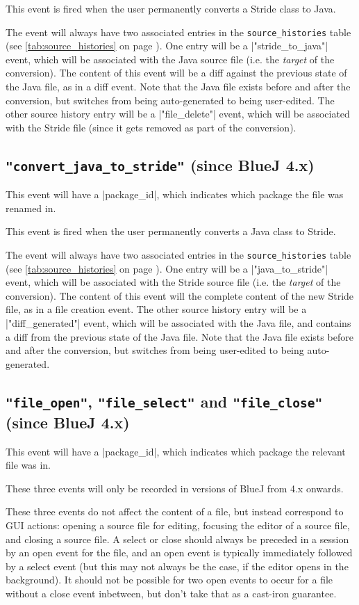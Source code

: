 \documentclass{report}
\newcommand{\myref}[1]{\autoref{#1} on page \pageref*{#1}}
\newcommand{\tabref}[1]{\lstinline|#1| table (see \myref{tab:#1})}
\begin{document}
This event is fired when the user permanently converts a Stride class to Java.

The event will always have two associated entries in the
\tabref{source_histories}.  One entry will be a |"stride_to_java"| event, which will
be associated with the Java source file (i.e. the \textit{target} of the conversion).  The content
  of this event will be a diff against the previous state of the Java file, as in a diff event.  Note that the Java file exists before and after the conversion, but switches from being auto-generated to being user-edited.
The other source history entry will be a |"file_delete"| event, which will be associated with the Stride file (since it gets
removed as part of the conversion).

\subsection{\lstinline!"convert_java_to_stride"! (since BlueJ 4.x)}

This event will have a |package_id|, which indicates which package the file
was renamed in.

This event is fired when the user permanently converts a Java class to Stride.

The event will always have two associated entries in the
\tabref{source_histories}.  One entry will be a |"java_to_stride"| event, which will
be associated with the Stride source file (i.e. the \textit{target} of the conversion).  The content
  of this event will the complete content of the new Stride file, as in a file creation event.
The other source history entry will be a |"diff_generated"| event, which will be associated with the Java file, and contains a diff from the previous state of the Java file.  Note that the Java file exists before and after the conversion, but switches from being user-edited to being auto-generated.

\subsection{\lstinline!"file_open"!, \lstinline!"file_select"! and \lstinline!"file_close"! (since BlueJ 4.x)}

This event will have a |package_id|, which indicates which package the relevant file
was in.

These three events will only be recorded in versions of BlueJ from 4.x onwards.

These three events do not affect the content of a file, but instead correspond to
GUI actions: opening a source file for editing, focusing the editor of a source file, and
closing a source file.  A select or close should always be preceded in a session by an
open event for the file, and an open event is typically immediately followed by a
select event (but this may not always be the case, if the editor opens in the background).
It should not be possible for two open events to occur for a file without a close event
inbetween, but don't take that as a cast-iron guarantee.
\end{document}
